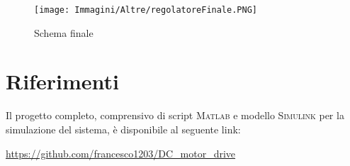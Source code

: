 \documentclass[a4paper,12pt]{article}
\begin{document}
\bigskip


\begin{figure}[h!]
    \centering
    \texttt{[image: Immagini/Altre/regolatoreFinale.PNG]}
    \caption{Schema finale}
    \label{fig: modelloFinale}
\end{figure}

\vspace{0.5cm}


\newpage

\section*{Riferimenti}

Il progetto completo, comprensivo di script \textsc{Matlab} e modello \textsc{Simulink} per la simulazione del sistema, è disponibile al seguente link:

\vspace{0.5cm}

\url{https://github.com/francesco1203/DC_motor_drive}
\end{document}
